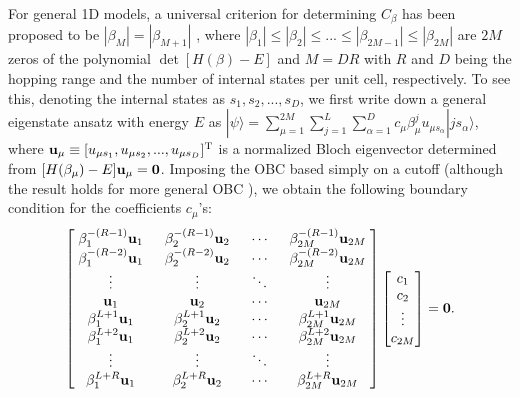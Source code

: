 \documentclass{tADP2e}
\theoremstyle{plain}
\theoremstyle{plain}
\theoremstyle{definition}
\begin{document}
For general 1D models, a universal criterion for determining $C_\beta$ has been proposed  to be $|\beta_M|=|\beta_{M+1}|$ \cite{TR19,KY19}, where $|\beta_1|\le|\beta_2|\le...\le|\beta_{2M-1}|\le|\beta_{2M}|$ are $2M$ zeros of the polynomial $\det[H(\beta)-E]$ and $M=DR$ with $R$ and $D$ being the hopping range and the number of internal states per unit cell, respectively. To see this, denoting the internal states as $s_1,s_2,...,s_D$, we first %
write down a general eigenstate ansatz %
with energy $E$ as $|\psi\rangle=\sum^{2M}_{\mu=1}\sum^L_{j=1}\sum^D_{\alpha=1}c_\mu \beta^j_\mu u_{\mu s_\alpha}|js_\alpha\rangle$, 
where $\bold{u}_\mu\equiv[u_{\mu s_1},u_{\mu s_2},...,u_{\mu s_D}]^{\rm T}$ is a normalized Bloch eigenvector determined from $[H(\beta_\mu)-E]\bold{u}_\mu=\bold{0}$. Imposing the OBC based simply on a cutoff (although the result holds for more general OBC \cite{KY19}), we obtain the following boundary condition for the coefficients $c_\mu$'s:
\begin{equation}
\begin{bmatrix} 
\;\beta_1^{-(R-1)}\bold{u}_1\; & \;\beta_2^{-(R-1)}\bold{u}_2\; & \;\cdots\; & \;\beta_{2M}^{-(R-1)}\bold{u}_{2M}\; \\
\;\beta_1^{-(R-2)}\bold{u}_1\; & \;\beta_2^{-(R-2)}\bold{u}_2\; & \;\cdots\; & \;\beta_{2M}^{-(R-2)}\bold{u}_{2M}\; \\
\;\vdots\; & \;\vdots\; & \;\ddots\; & \;\vdots\; \\
\;\bold{u}_1\; & \;\bold{u}_2\; & \;\cdots\; & \;\bold{u}_{2M}\; \\
\;\beta_1^{L+1}\bold{u}_1\; & \;\beta_2^{L+1}\bold{u}_2\; & \;\cdots\; & \;\beta_{2M}^{L+1}\bold{u}_{2M}\; \\
\;\beta_1^{L+2}\bold{u}_1\; & \;\beta_2^{L+2}\bold{u}_2\; & \;\cdots\; & \;\beta_{2M}^{L+2}\bold{u}_{2M}\; \\
\;\vdots\; & \;\vdots\; & \;\ddots\; & \;\vdots\; \\
\;\beta_1^{L+R}\bold{u}_1\; & \;\beta_2^{L+R}\bold{u}_2\; & \;\cdots\; & \;\beta_{2M}^{L+R}\bold{u}_{2M}\; \\
\end{bmatrix}
\begin{bmatrix}
c_1 \\ c_2 \\ \vdots \\ c_{2M}
\end{bmatrix}
=\bold{0}.
\label{bcfc}
\end{equation}
\end{document}
